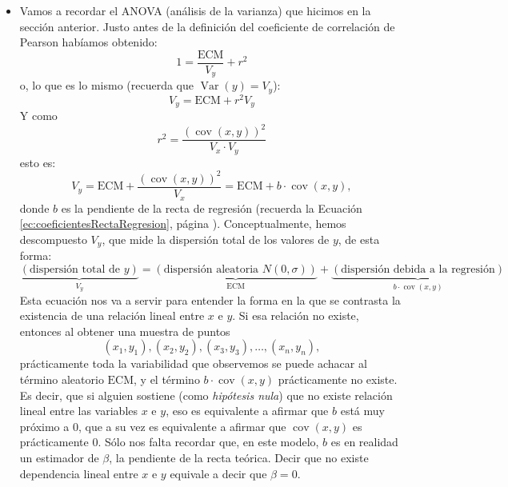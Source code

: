 \begin{itemize}
    \subsection*{}\label{sec:anova}
    \item Vamos a recordar el ANOVA (análisis de la varianza) que hicimos en la sección anterior. Justo antes de la definición del coeficiente de correlación de Pearson habíamos obtenido:
        \[1=\dfrac{\mbox{ECM}}{V_y}+r^2\]
        o, lo que es lo mismo (recuerda que $\operatorname{Var}(y)=V_y$):
        \[V_y=\mbox{ECM}+r^2V_y\]
        Y como
        \[r^2=\dfrac{(\operatorname{cov}(x,y))^2}{V_x\cdot V_y}\]
        esto es:
        \[V_y=\mbox{ECM}+\dfrac{(\operatorname{cov}(x,y))^2}{V_x}=\mbox{ECM}+b\cdot\operatorname{cov}(x,y),\]
        donde $b$ es la pendiente de la recta de regresión (recuerda la Ecuación \ref{ec:coeficientesRectaRegresion}, página \pageref{ec:coeficientesRectaRegresion}). Conceptualmente, hemos descompuesto $V_y$, que mide la dispersión total de los valores de $y$, de esta forma:
        \[
        \underbrace{\left(\mbox{dispersión total de }y\right)}_{V_y}=
        \underbrace{\left(\mbox{dispersión aleatoria }N(0,\sigma)\right)}_{\mbox{ECM}}+
        \underbrace{\left(\mbox{dispersión debida a la regresión}\right)}_{b\cdot\operatorname{cov}(x,y)}
        \]
        Esta ecuación nos va a servir para entender la forma en la que se contrasta la existencia de una relación lineal entre $x$ e $y$. Si esa relación no existe, entonces al obtener una muestra de puntos
        \[(x_1,y_1),(x_2,y_2),(x_3,y_3),\ldots,(x_n,y_n),\]
        prácticamente toda la variabilidad que observemos se puede achacar al término aleatorio $\mbox{ECM}$, y el término $b\cdot\operatorname{cov}(x,y)$ prácticamente no existe. Es decir, que si alguien sostiene (como {\em hipótesis nula}) que no existe relación lineal entre las variables $x$ e $y$, eso es equivalente a afirmar que $b$ está muy próximo a $0$, que a su vez es equivalente a afirmar que $\operatorname{cov}(x,y)$ es prácticamente $0$. Sólo nos falta recordar que, en este modelo, $b$ es en realidad un estimador de $\beta$, la pendiente de la recta teórica. Decir que no existe dependencia lineal entre $x$ e $y$ equivale a decir que $\beta=0$.


\end{itemize}
